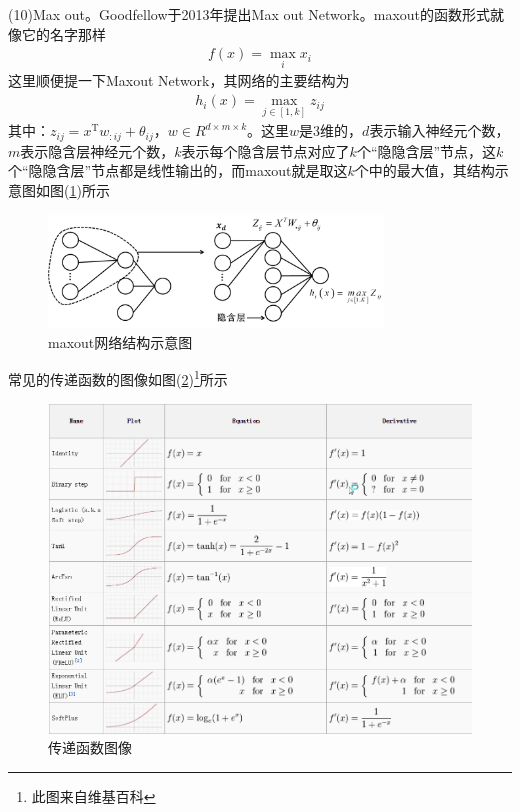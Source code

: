             (10)Max out。Goodfellow于2013年提出Max out Network。maxout的函数形式就像它的名字那样
            \begin{align*}
            f(x) = \max_i x_i
            \end{align*}
            这里顺便提一下Maxout Network，其网络的主要结构为
            \begin{align*}
            h_i(x) = \max_{j\in [1,k]} z_{ij}
            \end{align*}
            其中：$z_{ij} = x^\mathrm{T}w_{:ij}+\theta_{ij}$，$w\in R^{d\times m\times k}$。这里$w$是3维的，$d$表示输入神经元个数，$m$表示隐含层神经元个数，$k$表示每个隐含层节点对应了$k$个“隐隐含层”节点，这$k$个“隐隐含层”节点都是线性输出的，而maxout就是取这$k$个中的最大值，其结构示意图如图(\ref{fig:maxout网络结构示意图})所示
            \begin{figure}[H]
            \centering
            \includegraphics[height=3cm]{images/maxout_net_structure.jpg}
            \caption{maxout网络结构示意图}
            \label{fig:maxout网络结构示意图}
            \end{figure}
            \par
            常见的传递函数的图像如图(\ref{fig:传递函数图像})\footnote{此图来自维基百科}所示
            \begin{figure}[H]
            \centering
            \includegraphics[width=12cm]{images/transfer_func.png}
            \caption{传递函数图像}
            \label{fig:传递函数图像}
            \end{figure}
